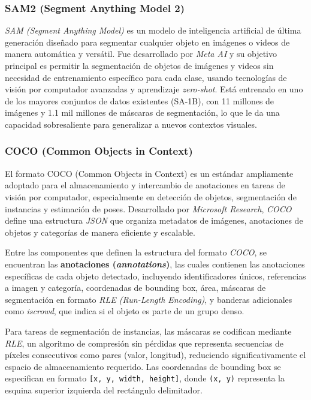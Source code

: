 \subsubsection{SAM2 (Segment Anything Model 2)}

\emph{SAM (Segment Anything Model)} \cite{kirillov2023segany, ravi2024sam2segmentimages} es un modelo de inteligencia artificial de última generación diseñado para segmentar cualquier objeto en imágenes o videos de manera automática y versátil. Fue desarrollado por \emph{Meta AI} y su objetivo principal es permitir la segmentación de objetos de imágenes y videos sin necesidad de entrenamiento específico para cada clase, usando tecnologías de visión por computador avanzadas y aprendizaje \emph{zero-shot}. Está entrenado en uno de los mayores conjuntos de datos existentes (SA-1B), con 11 millones de imágenes y 1.1 mil millones de máscaras de segmentación, lo que le da una capacidad sobresaliente para generalizar a nuevos contextos visuales.

\subsubsection{COCO (Common Objects in Context)}
El formato COCO (Common Objects in Context) \cite{lin2015microsoftcococommonobjects} es un estándar ampliamente adoptado para el almacenamiento y intercambio de anotaciones en tareas de visión por computador, especialmente en detección de objetos, segmentación de instancias y estimación de poses. Desarrollado por \emph{Microsoft Research},  \emph{COCO} define una estructura \emph{JSON} \cite{crockford2006application} que organiza metadatos de imágenes, anotaciones de objetos y categorías de manera eficiente y escalable.

\vspace{5mm}

Entre las componentes que definen la estructura del formato \emph{COCO}, se encuentran las \textbf{anotaciones (\emph{annotations})}, las cuales contienen las anotaciones específicas de cada objeto detectado, incluyendo identificadores únicos, referencias a imagen y categoría, coordenadas de bounding box, área, máscaras de segmentación en formato \emph{RLE (Run-Length Encoding)}, y banderas adicionales como \emph{iscrowd}, que indica si el objeto es parte de un grupo denso.

\vspace{5mm}

Para tareas de segmentación de instancias, las máscaras se codifican mediante \emph{RLE}, un algoritmo de compresión sin pérdidas que representa secuencias de píxeles consecutivos como pares (valor, longitud), reduciendo significativamente el espacio de almacenamiento requerido. Las coordenadas de bounding box se especifican en formato \texttt{[x, y, width, height]}, donde \texttt{(x, y)} representa la esquina superior izquierda del rectángulo delimitador.


